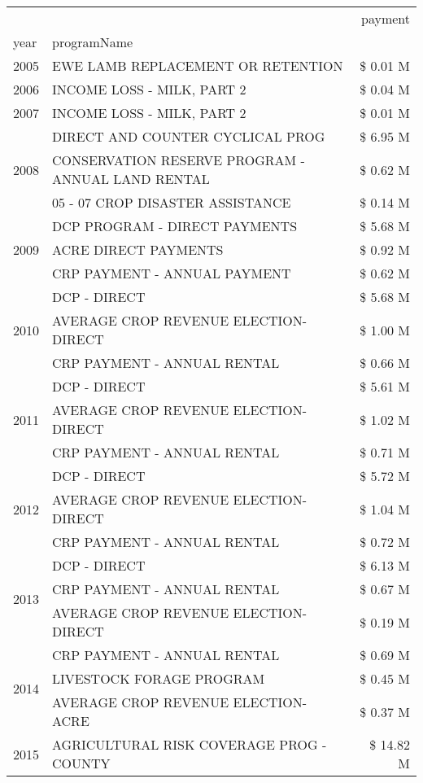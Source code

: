 \begin{tabular}{llr}
\toprule
 &  & payment \\
year & programName &  \\
\midrule
2005 & EWE LAMB REPLACEMENT OR RETENTION & \$ 0.01 M \\
\cline{1-3}
2006 & INCOME LOSS - MILK, PART 2 & \$ 0.04 M \\
\cline{1-3}
2007 & INCOME LOSS - MILK, PART 2 & \$ 0.01 M \\
\cline{1-3}
\multirow[t]{3}{*}{2008} & DIRECT AND COUNTER CYCLICAL PROG & \$ 6.95 M \\
 & CONSERVATION RESERVE PROGRAM - ANNUAL LAND RENTAL & \$ 0.62 M \\
 & 05 - 07 CROP DISASTER ASSISTANCE & \$ 0.14 M \\
\cline{1-3}
\multirow[t]{3}{*}{2009} & DCP PROGRAM - DIRECT PAYMENTS & \$ 5.68 M \\
 & ACRE DIRECT PAYMENTS & \$ 0.92 M \\
 & CRP PAYMENT - ANNUAL PAYMENT & \$ 0.62 M \\
\cline{1-3}
\multirow[t]{3}{*}{2010} & DCP - DIRECT & \$ 5.68 M \\
 & AVERAGE CROP REVENUE ELECTION-DIRECT & \$ 1.00 M \\
 & CRP PAYMENT - ANNUAL RENTAL & \$ 0.66 M \\
\cline{1-3}
\multirow[t]{3}{*}{2011} & DCP - DIRECT & \$ 5.61 M \\
 & AVERAGE CROP REVENUE ELECTION-DIRECT & \$ 1.02 M \\
 & CRP PAYMENT - ANNUAL RENTAL & \$ 0.71 M \\
\cline{1-3}
\multirow[t]{3}{*}{2012} & DCP - DIRECT & \$ 5.72 M \\
 & AVERAGE CROP REVENUE ELECTION-DIRECT & \$ 1.04 M \\
 & CRP PAYMENT - ANNUAL RENTAL & \$ 0.72 M \\
\cline{1-3}
\multirow[t]{3}{*}{2013} & DCP - DIRECT & \$ 6.13 M \\
 & CRP PAYMENT - ANNUAL RENTAL & \$ 0.67 M \\
 & AVERAGE CROP REVENUE ELECTION-DIRECT & \$ 0.19 M \\
\cline{1-3}
\multirow[t]{3}{*}{2014} & CRP PAYMENT - ANNUAL RENTAL & \$ 0.69 M \\
 & LIVESTOCK FORAGE PROGRAM & \$ 0.45 M \\
 & AVERAGE CROP REVENUE ELECTION-ACRE & \$ 0.37 M \\
\cline{1-3}
\multirow[t]{3}{*}{2015} & AGRICULTURAL RISK COVERAGE PROG - COUNTY & \$ 14.82 M \\

\end{tabular}
